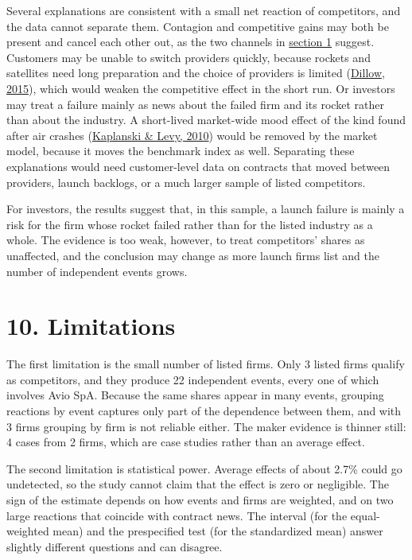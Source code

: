 \documentclass[12pt,a4paper]{article}
\begin{document}
Several explanations are consistent with a small net reaction of competitors, and the data cannot separate them. Contagion and competitive gains may both be present and cancel each other out, as the two channels in \hyperlink{s1}{section 1} suggest. Customers may be unable to switch providers quickly, because rockets and satellites need long preparation and the choice of providers is limited (\hyperlink{ref-dillow2015}{Dillow, 2015}), which would weaken the competitive effect in the short run. Or investors may treat a failure mainly as news about the failed firm and its rocket rather than about the industry. A short-lived market-wide mood effect of the kind found after air crashes (\hyperlink{ref-kaplanski2010}{Kaplanski \& Levy, 2010}) would be removed by the market model, because it moves the benchmark index as well. Separating these explanations would need customer-level data on contracts that moved between providers, launch backlogs, or a much larger sample of listed competitors.

For investors, the results suggest that, in this sample, a launch failure is mainly a risk for the firm whose rocket failed rather than for the listed industry as a whole. The evidence is too weak, however, to treat competitors' shares as unaffected, and the conclusion may change as more launch firms list and the number of independent events grows.

\section*{\hypertarget{s10}{}10. Limitations}
The first limitation is the small number of listed firms. Only 3 listed firms qualify as competitors, and they produce 22 independent events, every one of which involves Avio SpA. Because the same shares appear in many events, grouping reactions by event captures only part of the dependence between them, and with 3 firms grouping by firm is not reliable either. The maker evidence is thinner still: 4 cases from 2 firms, which are case studies rather than an average effect.

The second limitation is statistical power. Average effects of about 2.7\% could go undetected, so the study cannot claim that the effect is zero or negligible. The sign of the estimate depends on how events and firms are weighted, and on two large reactions that coincide with contract news. The interval (for the equal-weighted mean) and the prespecified test (for the standardized mean) answer slightly different questions and can disagree.
\end{document}
